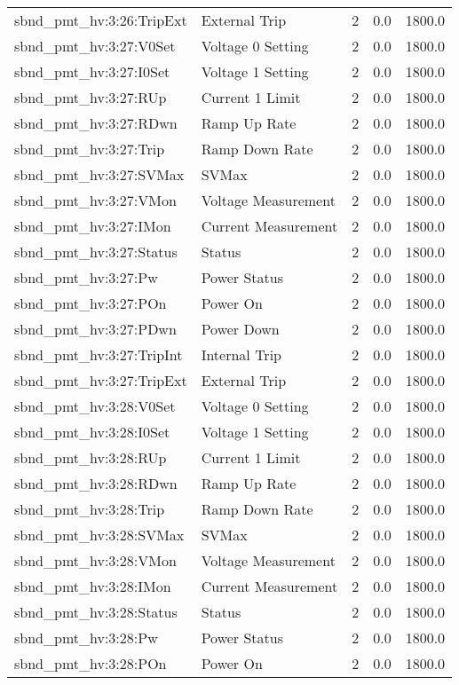 \begin{center}
\begin{longtable}{l | l l l l }
sbnd\_pmt\_hv:3:26:TripExt & External Trip & 2 & 0.0 & 1800.0\\ 
sbnd\_pmt\_hv:3:27:V0Set & Voltage 0 Setting & 2 & 0.0 & 1800.0\\ 
sbnd\_pmt\_hv:3:27:I0Set & Voltage 1 Setting & 2 & 0.0 & 1800.0\\ 
sbnd\_pmt\_hv:3:27:RUp & Current 1 Limit & 2 & 0.0 & 1800.0\\ 
sbnd\_pmt\_hv:3:27:RDwn & Ramp Up Rate & 2 & 0.0 & 1800.0\\ 
sbnd\_pmt\_hv:3:27:Trip & Ramp Down Rate & 2 & 0.0 & 1800.0\\ 
sbnd\_pmt\_hv:3:27:SVMax & SVMax & 2 & 0.0 & 1800.0\\ 
sbnd\_pmt\_hv:3:27:VMon & Voltage Measurement & 2 & 0.0 & 1800.0\\ 
sbnd\_pmt\_hv:3:27:IMon & Current Measurement & 2 & 0.0 & 1800.0\\ 
sbnd\_pmt\_hv:3:27:Status & Status & 2 & 0.0 & 1800.0\\ 
sbnd\_pmt\_hv:3:27:Pw & Power Status & 2 & 0.0 & 1800.0\\ 
sbnd\_pmt\_hv:3:27:POn & Power On & 2 & 0.0 & 1800.0\\ 
sbnd\_pmt\_hv:3:27:PDwn & Power Down & 2 & 0.0 & 1800.0\\ 
sbnd\_pmt\_hv:3:27:TripInt & Internal Trip & 2 & 0.0 & 1800.0\\ 
sbnd\_pmt\_hv:3:27:TripExt & External Trip & 2 & 0.0 & 1800.0\\ 
sbnd\_pmt\_hv:3:28:V0Set & Voltage 0 Setting & 2 & 0.0 & 1800.0\\ 
sbnd\_pmt\_hv:3:28:I0Set & Voltage 1 Setting & 2 & 0.0 & 1800.0\\ 
sbnd\_pmt\_hv:3:28:RUp & Current 1 Limit & 2 & 0.0 & 1800.0\\ 
sbnd\_pmt\_hv:3:28:RDwn & Ramp Up Rate & 2 & 0.0 & 1800.0\\ 
sbnd\_pmt\_hv:3:28:Trip & Ramp Down Rate & 2 & 0.0 & 1800.0\\ 
sbnd\_pmt\_hv:3:28:SVMax & SVMax & 2 & 0.0 & 1800.0\\ 
sbnd\_pmt\_hv:3:28:VMon & Voltage Measurement & 2 & 0.0 & 1800.0\\ 
sbnd\_pmt\_hv:3:28:IMon & Current Measurement & 2 & 0.0 & 1800.0\\ 
sbnd\_pmt\_hv:3:28:Status & Status & 2 & 0.0 & 1800.0\\ 
sbnd\_pmt\_hv:3:28:Pw & Power Status & 2 & 0.0 & 1800.0\\ 
sbnd\_pmt\_hv:3:28:POn & Power On & 2 & 0.0 & 1800.0\\ 

\end{longtable}
\end{center}
